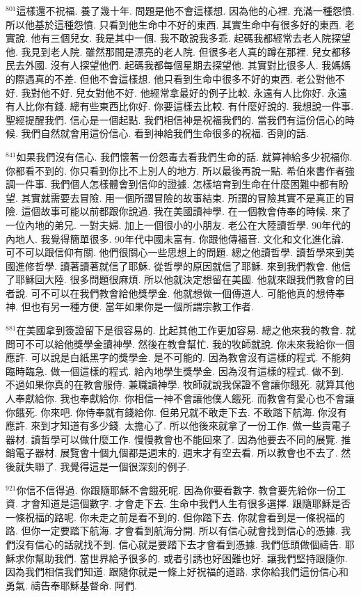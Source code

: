 \documentclass{book}
\begin{document}
$^{801}$這樣還不祝福.
養了幾十年.
問題是他不會這樣想.
因為他的心裡.
充滿一種怨憤.
所以他基於這種怨憤.
只看到他生命中不好的東西.
其實生命中有很多好的東西.
老實說.
他有三個兒女.
我是其中一個.
我不敢說我多乖.
起碼我都經常去老人院探望他.
我見到老人院.
雖然那間是漂亮的老人院.
但很多老人真的蹲在那裡.
兒女都移民去外國.
沒有人探望他們.
起碼我都每個星期去探望他.
其實對比很多人.
我媽媽的際遇真的不差.
但他不會這樣想.
他只看到生命中很多不好的東西.
老公對他不好.
我對他不好.
兒女對他不好.
他經常拿最好的例子比較.
永遠有人比你好.
永遠有人比你有錢.
總有些東西比你好.
你要這樣去比較.
有什麼好說的.
我想說一件事.
聖經提醒我們.
信心是一個起點.
我們相信神是祝福我們的.
當我們有這份信心的時候.
我們自然就會用這份信心.
看到神給我們生命很多的祝福.
否則的話.

$^{841}$如果我們沒有信心.
我們懷著一份怨毒去看我們生命的話.
就算神給多少祝福你.
你都看不到的.
你只看到你比不上別人的地方.
所以最後再說一點.
希伯來書作者強調一件事.
我們個人怎樣體會到信仰的證據.
怎樣培育到生命在什麼困難中都有盼望.
其實就需要去冒險.
用一個所謂冒險的故事結束.
所謂的冒險其實不是真正的冒險.
這個故事可能以前都跟你說過.
我在美國讀神學.
在一個教會侍奉的時候.
來了一位內地的弟兄.
一對夫婦.
加上一個很小的小朋友.
老公在大陸讀哲學.
90年代的內地人.
我覺得簡單很多.
90年代中國未富有.
你跟他傳福音.
文化和文化進化論.
可不可以跟信仰有關.
他們很關心一些思想上的問題.
總之他讀哲學.
讀哲學來到美國進修哲學.
讀著讀著就信了耶穌.
從哲學的原因就信了耶穌.
來到我們教會.
他信了耶穌回大陸.
很多問題很麻煩.
所以他就決定想留在美國.
他就來跟我們教會的目者說.
可不可以在我們教會給他獎學金.
他就想做一個傳道人.
可能他真的想侍奉神.
但也有另一種方便.
當年如果你是一個所謂宗教工作者.

$^{881}$在美國拿到簽證留下是很容易的.
比起其他工作更加容易.
總之他來我的教會.
就問可不可以給他獎學金讀神學.
然後在教會幫忙.
我的牧師就說.
你未來我給你一個應許.
可以說是白紙黑字的獎學金.
是不可能的.
因為教會沒有這樣的程式.
不能夠臨時臨急.
做一個這樣的程式.
給內地學生獎學金.
因為沒有這樣的程式.
做不到.
不過如果你真的在教會服侍.
兼職讀神學.
牧師就說我保證不會讓你餓死.
就算其他人奉獻給你.
我也奉獻給你.
你相信一神不會讓他僕人餓死.
而教會有愛心也不會讓你餓死.
你來吧.
你侍奉就有錢給你.
但弟兄就不敢走下去.
不敢踏下航海.
你沒有應許.
來到才知道有多少錢.
太擔心了.
所以他後來就拿了一份工作.
做一些賣電子器材.
讀哲學可以做什麼工作.
慢慢教會也不能回來了.
因為他要去不同的展覽.
推銷電子器材.
展覽會十個九個都是週末的.
週末才有空去看.
所以教會也不去了.
然後就失聯了.
我覺得這是一個很深刻的例子.

$^{921}$你信不信得過.
你跟隨耶穌不會餓死呢.
因為你要看數字.
教會要先給你一份工資.
才會知道是這個數字.
才會走下去.
生命中我們人生有很多選擇.
跟隨耶穌是否一條祝福的路呢.
你未走之前是看不到的.
但你踏下去.
你就會看到是一條祝福的路.
但你一定要踏下航海.
才會看到航海分開.
所以有信心就會找到信心的憑據.
我們沒有信心的話就找不到.
信心就是要踏下去才會看到憑據.
我們低頭做個禱告.
耶穌求你幫助我們.
當世界給予很多的.
或者引誘也好困難也好.
讓我們堅持跟隨你.
因為我們相信我們知道.
跟隨你就是一條上好祝福的道路.
求你給我們這份信心和勇氣.
禱告奉耶穌基督命.
阿們.
\newpage
\end{document}

